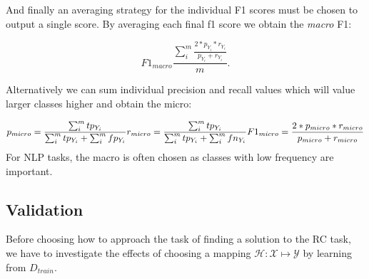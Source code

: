 \begin{center}
\end{center}

And finally an averaging strategy for the individual F1 scores must be chosen to output a single score. By averaging each final f1 score we obtain the \emph{macro} F1: 

$$ 
F1_{macro} \frac{\sum_{i}^{m} \frac{2 * p_{Y_i} * r_{Y_i}}{p_{Y_i} + r_{Y_i}}}{m}. 
$$

Alternatively we can sum individual precision and recall values which will value larger classes higher and obtain the micro:

$$
p_{micro} = \frac{\sum_{i}^{m} tp_{Y_i} } {\sum_{i}^{m} tp_{Y_i}+\sum_{i}^{m} fp_{Y_i}} \\
r_{micro} = \frac{\sum_{i}^{m} tp_{Y_i} } {\sum_{i}^{m} tp_{Y_i}+\sum_{i}^{m} fn_{Y_i}} \\
F1_{micro} = \frac{2 * p_{micro} * r_{micro}}{p_{micro} + r_{micro}} \\
$$
For NLP tasks, the macro is often chosen as classes with low frequency are important. 

\subsection{Validation}

Before choosing how to approach the task of finding a solution to the RC task, we have to investigate the effects of choosing a mapping $\mathcal{H}:\mathcal{X}\mapsto\mathcal{Y}$ by learning from $D_{train}$. 








